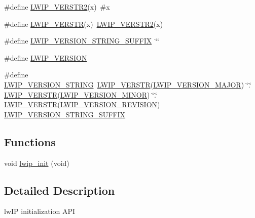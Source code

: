 \begin{DoxyCompactItemize}
\item 
\#define \hyperlink{group__lwip__version_gaf32777134eea478cc10bada0629a9e7e}{L\+W\+I\+P\+\_\+\+V\+E\+R\+S\+T\+R2}(x)~\#x
\item 
\#define \hyperlink{group__lwip__version_ga6dcc57b1d685cae569b2c9c9461de0e2}{L\+W\+I\+P\+\_\+\+V\+E\+R\+S\+TR}(x)~\hyperlink{group__lwip__version_gaf32777134eea478cc10bada0629a9e7e}{L\+W\+I\+P\+\_\+\+V\+E\+R\+S\+T\+R2}(x)
\item 
\#define \hyperlink{group__lwip__version_ga548fd1ff32bddf18074d284b794a3983}{L\+W\+I\+P\+\_\+\+V\+E\+R\+S\+I\+O\+N\+\_\+\+S\+T\+R\+I\+N\+G\+\_\+\+S\+U\+F\+F\+IX}~\char`\"{}\char`\"{}
\item 
\#define \hyperlink{group__lwip__version_ga0a0d322fad0a67aa5b8f1b8c9dfcfe59}{L\+W\+I\+P\+\_\+\+V\+E\+R\+S\+I\+ON}
\item 
\#define \hyperlink{group__lwip__version_gab47e87bc38eef94486db402813183ba7}{L\+W\+I\+P\+\_\+\+V\+E\+R\+S\+I\+O\+N\+\_\+\+S\+T\+R\+I\+NG}~\hyperlink{group__lwip__version_ga6dcc57b1d685cae569b2c9c9461de0e2}{L\+W\+I\+P\+\_\+\+V\+E\+R\+S\+TR}(\hyperlink{group__lwip__version_ga4308c06ef36496e00c798d96d7d03246}{L\+W\+I\+P\+\_\+\+V\+E\+R\+S\+I\+O\+N\+\_\+\+M\+A\+J\+OR}) \char`\"{}.\char`\"{} \hyperlink{group__lwip__version_ga6dcc57b1d685cae569b2c9c9461de0e2}{L\+W\+I\+P\+\_\+\+V\+E\+R\+S\+TR}(\hyperlink{group__lwip__version_ga1e596388c15ba81e753c5633fad1c034}{L\+W\+I\+P\+\_\+\+V\+E\+R\+S\+I\+O\+N\+\_\+\+M\+I\+N\+OR}) \char`\"{}.\char`\"{} \hyperlink{group__lwip__version_ga6dcc57b1d685cae569b2c9c9461de0e2}{L\+W\+I\+P\+\_\+\+V\+E\+R\+S\+TR}(\hyperlink{group__lwip__version_ga0a57983df1b199cf39a2e6a2d90e3d50}{L\+W\+I\+P\+\_\+\+V\+E\+R\+S\+I\+O\+N\+\_\+\+R\+E\+V\+I\+S\+I\+ON}) \hyperlink{group__lwip__version_ga548fd1ff32bddf18074d284b794a3983}{L\+W\+I\+P\+\_\+\+V\+E\+R\+S\+I\+O\+N\+\_\+\+S\+T\+R\+I\+N\+G\+\_\+\+S\+U\+F\+F\+IX}
\end{DoxyCompactItemize}
\subsection*{Functions}
\begin{DoxyCompactItemize}
\item 
void \hyperlink{group__lwip__nosys_ga0c1a18439524d2f4a5e51d25c0ca2ce9}{lwip\+\_\+init} (void)
\end{DoxyCompactItemize}


\subsection{Detailed Description}
lw\+IP initialization A\+PI 